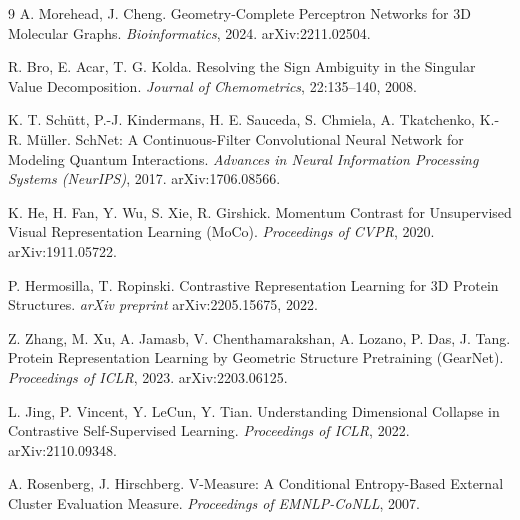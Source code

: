 \documentclass[11pt,a4paper]{article}
\theoremstyle{definition}
\begin{document}
\begin{thebibliography}{9}
A. Morehead, J. Cheng.
\newblock Geometry-Complete Perceptron Networks for 3D Molecular Graphs.
\newblock \emph{Bioinformatics}, 2024. arXiv:2211.02504.

R. Bro, E. Acar, T. G. Kolda.
\newblock Resolving the Sign Ambiguity in the Singular Value Decomposition.
\newblock \emph{Journal of Chemometrics}, 22:135--140, 2008.

K. T. Sch\"utt, P.-J. Kindermans, H. E. Sauceda, S. Chmiela, A. Tkatchenko,
K.-R. M\"uller.
\newblock SchNet: A Continuous-Filter Convolutional Neural Network for Modeling
Quantum Interactions.
\newblock \emph{Advances in Neural Information Processing Systems (NeurIPS)}, 2017.
arXiv:1706.08566.

K. He, H. Fan, Y. Wu, S. Xie, R. Girshick.
\newblock Momentum Contrast for Unsupervised Visual Representation Learning (MoCo).
\newblock \emph{Proceedings of CVPR}, 2020. arXiv:1911.05722.

P. Hermosilla, T. Ropinski.
\newblock Contrastive Representation Learning for 3D Protein Structures.
\newblock \emph{arXiv preprint} arXiv:2205.15675, 2022.

Z. Zhang, M. Xu, A. Jamasb, V. Chenthamarakshan, A. Lozano, P. Das, J. Tang.
\newblock Protein Representation Learning by Geometric Structure Pretraining
(GearNet).
\newblock \emph{Proceedings of ICLR}, 2023. arXiv:2203.06125.

L. Jing, P. Vincent, Y. LeCun, Y. Tian.
\newblock Understanding Dimensional Collapse in Contrastive Self-Supervised
Learning.
\newblock \emph{Proceedings of ICLR}, 2022. arXiv:2110.09348.

A. Rosenberg, J. Hirschberg.
\newblock V-Measure: A Conditional Entropy-Based External Cluster Evaluation
Measure.
\newblock \emph{Proceedings of EMNLP-CoNLL}, 2007.

\end{thebibliography}
\end{document}
